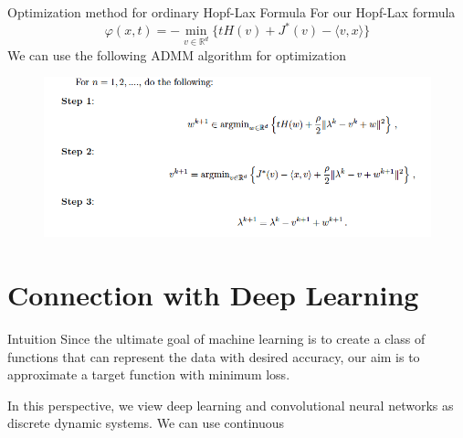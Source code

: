 \documentclass[english]{pkuslide}
\begin{document}
\begin{frame}{Optimization method for ordinary Hopf-Lax Formula}
For our Hopf-Lax formula 
 \begin{equation}
\varphi(x,t) = -\min_{v \in \mathbb{R}^{d}}\{tH(v)+J^{*}(v)-\langle v,x \rangle\}
\end{equation}
We can use the following ADMM algorithm for optimization
\begin{figure}
\centering
\includegraphics[height=0.5\textheight]{9.png}
\end{figure}

\end{frame}
\section{Connection with Deep Learning}

	\frame{\sectionpage}

	\begin{frame}{Intuition}
\nocite{*} 
Since the ultimate goal of machine learning is to create a class of functions that can represent the data with desired accuracy, our aim is to approximate a target function with minimum loss. 

In this perspective, we view deep learning and convolutional neural networks as discrete dynamic systems.
We can use continuous
	\end{frame}


{}
\end{document}
